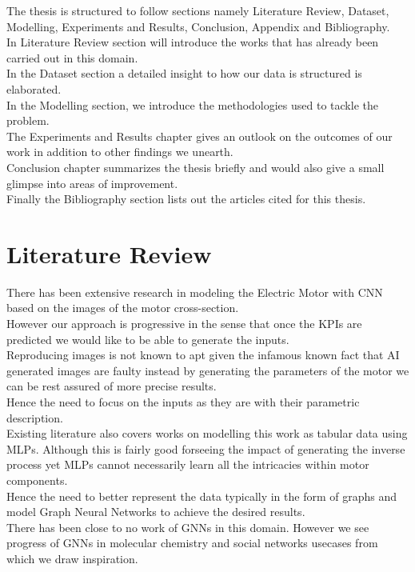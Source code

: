 \documentclass{report} %
\begin{document}
The thesis is structured to follow sections namely Literature Review, Dataset, Modelling, Experiments and Results, Conclusion, Appendix and Bibliography.\\
In Literature Review section will introduce the works that has already been carried out in this domain. \\
In the Dataset section a detailed insight to how our data is structured is elaborated.\\
In the Modelling section, we introduce the methodologies used to tackle the problem. \\
The Experiments and Results chapter gives an outlook on the outcomes of our work in addition to other findings we unearth.\\ 
Conclusion chapter summarizes the thesis briefly and would also give a small glimpse into areas of improvement. \\
Finally the Bibliography section lists out the articles cited for this thesis.\\
\newpage 

\chapter{Literature Review} 
There has been extensive research in modeling the Electric Motor with \ac{CNN} based on the images of the motor cross-section. \\
However our approach is progressive in the sense that once the \ac{KPI}s are predicted we would like to be able to generate the inputs.\\
Reproducing images is not known to apt given the infamous known fact that AI generated images are faulty instead by generating the parameters of the motor we can be rest assured of more precise results. \\
Hence the need to focus on the inputs as they are with their parametric description.\\
Existing literature also covers works on modelling this work as tabular data using \ac{MLP}s. 
Although this is fairly good forseeing the impact of generating the inverse process yet \ac{MLP}s cannot necessarily learn all the intricacies within motor components. \\
Hence the need to better represent the data typically in the form of graphs and model Graph Neural Networks to achieve the desired results. \\
There has been close to no work of \ac{GNN}s in this domain. However we see progress of \ac{GNN}s in molecular chemistry and social networks usecases from which we draw inspiration.\\
\end{document}
